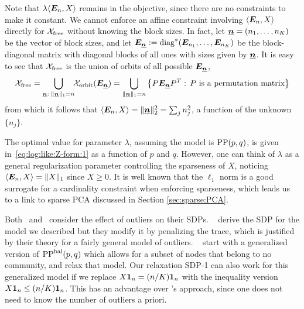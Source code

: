 Note that $\lambda \langle \bm{E}_n, X\rangle$ remains in the objective, since
there are no constraints to make it constant. 
We cannot enforce an affine constraint involving $\langle \bm{E}_n,X\rangle$
directly for $\mathcal{X}_{\text{free}}$ without knowing the block sizes. In fact, let ${\underline{\bm{n}}}
= (n_1,\dots,n_K)$ be the vector of block sizes, and let $\bm{E}_{\underline{\bm{n}}} :=
\operatorname{diag}^*(\bm{E}_{n_1},\dots,\bm{E}_{n_K})$ be the block-diagonal matrix with
diagonal blocks of all ones with sizes given by ${\underline{\bm{n}}}$. It is easy to see that $\mathcal{X}_{\text{free}}$ is the union of orbits of all possible $\bm{E}_{\underline{\bm{n}}}$, 
\begin{align}\label{eq:Xfree:union:orbit}
	\mathcal{X}_{\text{free}} = \bigcup_{{\underline{\bm{n}}}: \; \|{\underline{\bm{n}}}\|_1 = n} \!\!\mathcal{X}_{\text{orbit}}{(} \bm{E}_{\underline{\bm{n}}}  ) = 
	\bigcup_{\|{\underline{\bm{n}}}\|_1 = n} \big\{ P  \bm{E}_{\underline{\bm{n}}} P^T:\, \text{$P$ is a permutation matrix} \big\}
\end{align}
from which it follows that $\langle \bm{E}_n, X\rangle = \|{\underline{\bm{n}}}\|_2^2 = \sum_j
n_j^2$, a function of the unknown $\{n_j\}$.

The optimal value for parameter $\lambda$, assuming the model is
$\text{PP}(p,q)$, is given in~\eqref{eq:log:like:Z-form:1} as a function
of $p$ and $q$. However, one
can think of $\lambda$ as a general regularization parameter
controlling the sparseness of $X$, noticing $\langle \bm{E}_n,X\rangle =
\|X\|_1$ since $X \ge 0$. It is well known that the $\ell_1$ norm is a
good surrogate for a cardinality constraint when enforcing sparseness,
which leads us to a link to sparse PCA discussed in Section \ref{sec:sparse:PCA}. 

\begin{rem}\label{rem:outliers}
  Both~\cite{Chen2014} and~\cite{Cai2014} consider the effect of
  outliers on their SDPs. \CaiLi~\cite{Cai2014} derive the SDP for the
  model we described but they modify it by penalizing the trace, which
  is justified by their theory for a fairly general model of
  outliers. \ChenXu~\cite{Chen2014} start with a generalized version
  of $\text{PP}^{\text{bal}}(p,q)$ which allows for a subset of nodes that belong to
  no community, and relax that model.  Our relaxation SDP-1 can also
  work for this generalized model if we replace $X \bm{1}_n = (n/K)
  \bm{1}_n$ with the inequality version $X \bm{1}_n \le (n/K) \bm{1}_n$. This has an advantage over \ChenXu's approach, since one does not need to know the number of outliers a priori. 


\end{rem}


